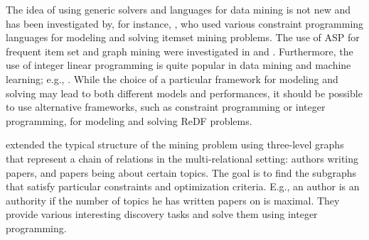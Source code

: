 The idea of using generic solvers and languages for data mining is not new and has been investigated by, for instance, \cite{GunsAIJ12,miningZinc,DBLP:conf/sac/MetivierBCKL12},
who used various constraint programming languages for modeling and solving itemset mining problems.  
The use of ASP for frequent item set and graph mining were investigated in \cite{DBLP:conf/lpnmr/Jarvisalo11} and \cite{ilp_graph_mining}.  
Furthermore, the use of 
integer linear programming is quite popular in data mining and machine learning; e.g., \citet{DBLP:conf/aaai/ChangRRR08}.
While the choice of a particular framework for modeling and solving may lead to both different models and performances, it should be possible to use alternative frameworks, such as constraint programming or integer programming, for modeling and solving ReDF problems. 

\citet{miningchains} extended the typical structure of the mining problem using three-level graphs that represent a chain of relations in the multi-relational setting: authors writing papers, and papers being about certain topics. The goal is to find the subgraphs that satisfy particular constraints and optimization criteria.
E.g., an author is an authority  if the number of topics he has written papers on is maximal. They provide various interesting discovery tasks 
and solve them using integer programming.



